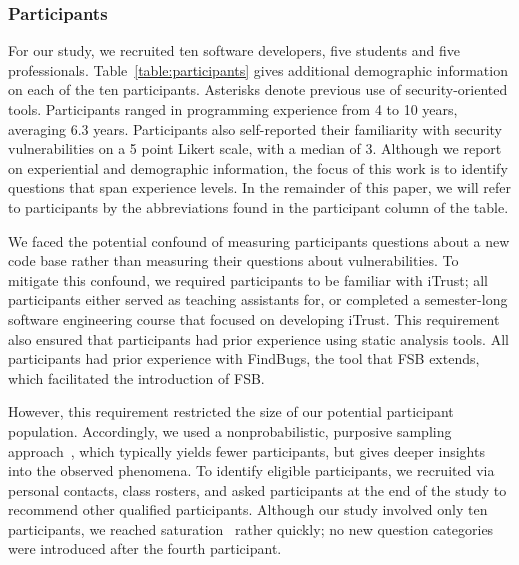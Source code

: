 \documentclass{sig-alternate}
\begin{document}
\subsubsection{Participants}
For our study, we recruited ten software developers, five students and five professionals. 
Table~\ref{table:participants} gives additional demographic information on each of the ten participants. 
Asterisks denote previous use of security-oriented tools.
Participants ranged in programming experience from 4 to 10 years, averaging 6.3 years.
Participants also self-reported their familiarity with security vulnerabilities on a 5 point Likert scale, with a median of 3.
Although we report on experiential and demographic information, the focus of this work is to identify questions that span experience levels.
In the remainder of this paper, we will refer to participants by the abbreviations found in the participant column of the table.

We faced the potential confound of measuring participants questions about a new code base rather than measuring their questions about vulnerabilities.
To mitigate this confound, we required participants to be familiar with iTrust;
all participants either served as teaching assistants for, or completed a semester-long software engineering course that focused on developing iTrust.
This requirement also ensured that participants had prior experience using static analysis tools.
All participants had prior experience with FindBugs, the tool that FSB extends, which facilitated the introduction of FSB.

However, this requirement restricted the size of our potential participant population.
Accordingly, we used a nonprobabilistic, purposive sampling approach~\cite{guest2006many}, which typically yields fewer participants, but gives deeper insights into the observed phenomena.
To identify eligible participants, we recruited via personal contacts, class rosters, and asked participants at the end of the study to recommend other qualified participants.
Although our study involved only ten participants, we reached saturation~\cite{glaser2009discovery} rather quickly; 
no new question categories were introduced after the fourth participant.

%

\end{document}
